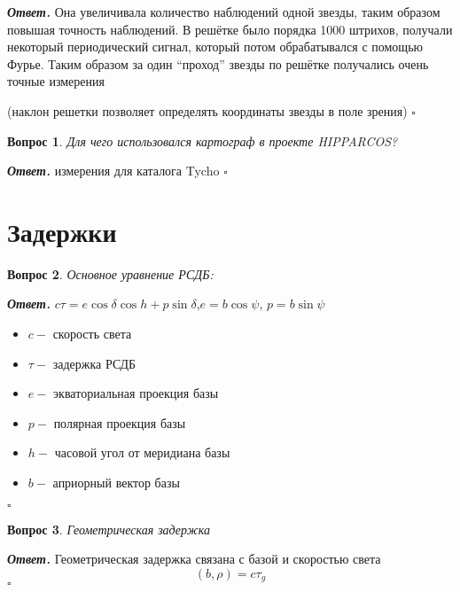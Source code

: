 \documentclass[12pt]{article}
\newtheorem{problem}{Вопрос}
\newenvironment{solution}[1][\it{Ответ}]{\textbf{#1. } }{$\square$}
\begin{document}
	\begin{solution}
		Она увеличивала количество наблюдений одной звезды, таким образом повышая точность
		наблюдений.	
		В решётке было порядка 1000 штрихов, получали некоторый периодический сигнал, который потом обрабатывался с помощью Фурье. Таким образом за один “проход” звезды по
		решётке получались очень точные измерения
		
		(наклон решетки позволяет определять координаты звезды в поле зрения)
	\end{solution}
	
	
	\begin{problem}
		Для чего использовался картограф в проекте HIPPARCOS?
	\end{problem}
	
	\begin{solution}
		измерения для каталога Tycho
	\end{solution}
	
\section{Задержки}
		\begin{problem}
			Основное уравнение РСДБ:
		\end{problem}
		
		\begin{solution}
			$c\tau = e\cos\delta \cos h + p \sin\delta$,$ e = b \cos\psi $, $ p = b \sin\psi $
			
			
			\begin{itemize}
				\item $c -$ скорость света
				\item $\tau -$ задержка РСДБ
				\item $e -$ экваториальная проекция базы
				\item $p -$ полярная проекция базы
				\item $h -$ часовой угол от меридиана базы
				\item $b -$ априорный вектор базы
			\end{itemize}
		\end{solution}
		
		
		\begin{problem}
			Геометрическая задержка
		\end{problem}
		
		\begin{solution}
			Геометрическая задержка связана с базой и скоростью света $$(b,\rho) = c\tau_g$$
		\end{solution}
		
\end{document}
